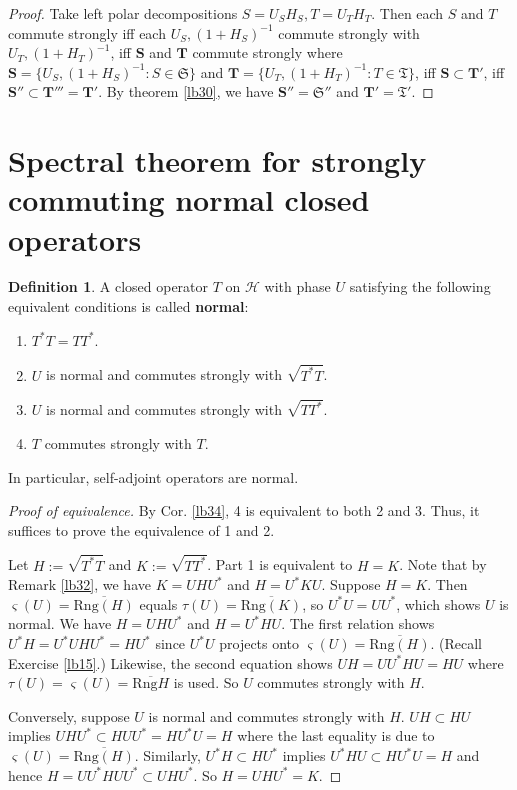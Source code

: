 \documentclass[12pt,b5paper,notitlepage]{article}
\theoremstyle{definition}
\newtheorem{df}{Definition}[section]
\theoremstyle{plain}
\newcommand{\fk}{\mathfrak}
\newcommand{\mc}{\mathcal}
\newcommand{\ovl}{\overline}
\newcommand{\sgm}{\varsigma}
\newcommand{\mbf}{\mathbf}
\newcommand{\Rng}{\mathrm{Rng}}
\numberwithin{equation}{section}
\begin{document}
\begin{proof}
Take left polar decompositions $S=U_SH_S,T=U_TH_T$. Then each $S$ and $T$ commute strongly iff each $U_S,(1+H_S)^{-1}$ commute strongly with $U_T,(1+H_T)^{-1}$, iff $\mbf S$ and $\mbf T$ commute strongly where $\mbf S=\{U_S,(1+H_S)^{-1}:S\in\fk S\}$ and $\mbf T=\{U_T,(1+H_T)^{-1}:T\in\fk T\}$, iff $\mbf S\subset\mbf T'$, iff $\mbf S''\subset\mbf T'''=\mbf T'$. By theorem \ref{lb30}, we have $\mbf S''=\fk S''$ and $\mbf T'=\fk T'$.
\end{proof}









\section{Spectral theorem for strongly commuting normal closed operators}\label{lb66}


\begin{df}\label{lb52}
A closed operator $T$ on $\mc H$ with phase $U$ satisfying the following equivalent conditions is called \textbf{normal}:
\begin{enumerate}
\item $T^*T=TT^*$.
\item $U$ is normal and commutes strongly with $\sqrt{T^*T}$. 
\item $U$ is normal and commutes strongly with $\sqrt{TT^*}$. 
\item $T$ commutes strongly with $T$.
\end{enumerate}
\end{df}

In particular, self-adjoint operators are normal.


\begin{proof}[Proof of equivalence]
By Cor. \ref{lb34}, 4 is equivalent to both 2 and 3. Thus, it suffices to prove the equivalence of 1 and 2. 

Let $H:=\sqrt {T^*T}$ and $K:=\sqrt{TT^*}$. Part 1 is equivalent to $H=K$. Note that by Remark \ref{lb32}, we have $K=UHU^*$ and $H=U^*KU$. Suppose $H=K$. Then $\sgm(U)=\ovl{\Rng(H)}$ equals $\tau(U)=\ovl{\Rng(K)}$, so $U^*U=UU^*$, which shows $U$ is normal. We have $H=UHU^*$ and $H=U^*HU$. The first relation shows $U^*H=U^*UHU^*=HU^*$ since $U^*U$ projects onto $\sgm(U)=\ovl{\Rng(H)}$. (Recall Exercise \ref{lb15}.) Likewise, the second equation shows $UH=UU^*HU=HU$ where $\tau(U)=\sgm(U)=\ovl{\Rng H}$ is used. So $U$ commutes strongly with $H$. 

Conversely, suppose $U$ is normal and commutes strongly with $H$. $UH\subset HU$ implies $UHU^*\subset HUU^*=HU^*U=H$ where the last equality is due to $\sgm(U)=\ovl{\Rng(H)}$. Similarly, $U^*H\subset HU^*$ implies $U^*HU\subset HU^*U=H$ and hence $H=UU^*HUU^*\subset UHU^*$. So $H=UHU^*=K$.
\end{proof}
\end{document}
